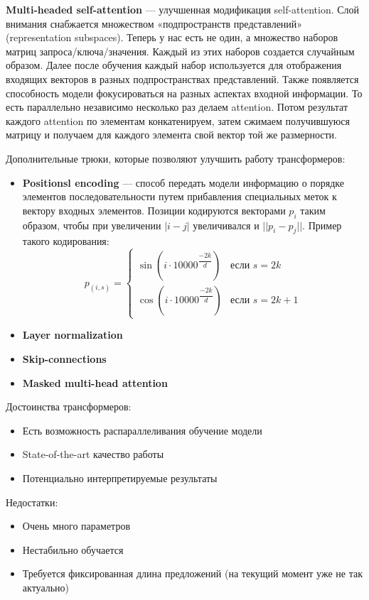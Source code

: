 \begin{definition}
    \textbf{Multi-headed self-attention} — улучшенная модификация self-attention.\newline
    Слой внимания снабжается множеством «подпространств представлений» (representation subspaces). Теперь у нас есть не один, а множество наборов матриц запроса/ключа/значения. Каждый из этих наборов создается случайным образом. Далее после обучения каждый набор используется для отображения входящих векторов в разных подпространствах представлений. Также появляется способность модели фокусироваться на разных аспектах входной информации.\newline
    То есть параллельно независимо несколько раз делаем attention. Потом результат каждого attention по элементам конкатенируем, затем сжимаем получившуюся матрицу и получаем для каждого элемента свой вектор той же размерности.
\end{definition}

Дополнительные трюки, которые позволяют улучшить работу трансформеров:
\begin{itemize}
    \item \textbf{Positionsl encoding} --- способ передать модели информацию о порядке элементов последовательности путем прибавления специальных меток к вектору входных элементов. Позиции кодируются векторами $p_i$ таким образом, чтобы при увеличении $|i-j|$ увеличивался и $||p_i-p_j||$. Пример такого кодирования:
    \[
        p_{(i,s)}=
        \begin{cases}
            \sin\left(i\cdot10000^{\dfrac{-2k}{d}}\right) & \text{если }s=2k\\
            \cos\left(i\cdot10000^{\dfrac{-2k}{d}}\right) & \text{если }s=2k+1
        \end{cases}
    \]
    \item \textbf{Layer normalization}
    \item \textbf{Skip-connections}
    \item \textbf{Masked multi-head attention}
\end{itemize}

Достоинства трансформеров:
\begin{itemize}
    \item Есть возможность распараллеливания обучение модели
    \item State-of-the-art качество работы
    \item Потенциально интерпретируемые результаты
\end{itemize}

Недостатки:
\begin{itemize}
    \item Очень много параметров
    \item Нестабильно обучается
    \item Требуется фиксированная длина предложений (на текущий момент уже не так актуально)
\end{itemize}